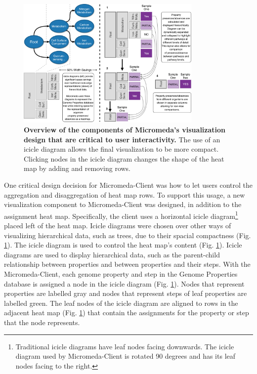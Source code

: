 \begin{figure}[!ht]
  \centering
	\includegraphics[width=0.8\textwidth]{media/visualization_design_philosphy.pdf}
	 \caption[Overview of the components of Micromeda's visualization design that 
are critical to user interactivity.]{\textbf{Overview of the components of 
Micromeda's visualization design that are critical to user interactivity.} The 
use of an icicle diagram allows the final visualization to be more compact. 
Clicking nodes in the icicle diagram changes the shape of the heat map by adding 
and removing rows.}
	 \label{fig:visualization-philosophy}
\end{figure}

One critical design decision for Micromeda-Client was how to let users control 
the aggregation and disaggregation of heat map rows. To support this 
usage, a new visualization component to Micromeda-Client was designed, in 
addition to the assignment heat map. Specifically, the client uses a horizontal 
icicle diagram\footnote{Traditional icicle diagrams have leaf nodes facing 
downwards. The icicle diagram used by Micromeda-Client is rotated 90 degrees and 
has its leaf nodes facing to the right.} placed left of the heat map. Icicle 
diagrams were chosen over other ways of visualizing hierarchical data, such as 
trees, due to their spacial compactness (Fig. 
\ref{fig:visualization-philosophy}). The icicle diagram is used to control the 
heat map's content (Fig. \ref{fig:visualization-philosophy}). Icicle diagrams 
are used to display hierarchical data, such as the parent-child relationship 
between properties and between properties and their steps. With the 
Micromeda-Client, each genome property and step in the Genome Properties 
database is assigned a node in the icicle diagram (Fig. 
\ref{fig:visualization-philosophy}). Nodes that represent properties are 
labelled gray and nodes that represent steps of leaf properties are labelled 
green. The leaf nodes of the icicle diagram are aligned to rows in the adjacent 
heat map (Fig. \ref{fig:visualization-philosophy}) that contain the assignments 
for the property or step that the node represents.

